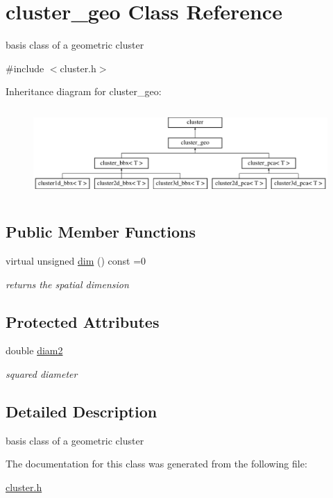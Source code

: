\hypertarget{classcluster__geo}{
\section{cluster\-\_\-geo \-Class \-Reference}
\label{classcluster__geo}
}


basis class of a geometric cluster  




{\ttfamily \#include $<$cluster.\-h$>$}

\-Inheritance diagram for cluster\-\_\-geo\-:\begin{figure}[H]
\begin{center}
\leavevmode
\includegraphics[height=3.419847cm]{classcluster__geo}
\end{center}
\end{figure}
\subsection*{\-Public \-Member \-Functions}
\begin{DoxyCompactItemize}
\item 
\hypertarget{classcluster__geo_a526263eed54fdc50ae80c8648a78e056}{
virtual unsigned \hyperlink{classcluster__geo_a526263eed54fdc50ae80c8648a78e056}{dim} () const =0}
\label{classcluster__geo_a526263eed54fdc50ae80c8648a78e056}

\begin{DoxyCompactList}\small\item\em returns the spatial dimension \end{DoxyCompactList}\end{DoxyCompactItemize}
\subsection*{\-Protected \-Attributes}
\begin{DoxyCompactItemize}
\item 
\hypertarget{classcluster__geo_a8e70ff925d9a1847985a2f63df8aa8ec}{
double \hyperlink{classcluster__geo_a8e70ff925d9a1847985a2f63df8aa8ec}{diam2}}
\label{classcluster__geo_a8e70ff925d9a1847985a2f63df8aa8ec}

\begin{DoxyCompactList}\small\item\em squared diameter \end{DoxyCompactList}\end{DoxyCompactItemize}


\subsection{\-Detailed \-Description}
basis class of a geometric cluster 

\-The documentation for this class was generated from the following file\-:\begin{DoxyCompactItemize}
\item 
\hyperlink{cluster_8h}{cluster.\-h}\end{DoxyCompactItemize}
